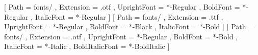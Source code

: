 [
  Path           = fonts/ ,
  Extension      = .otf ,
  UprightFont    = *-Regular ,
  BoldFont       = *-Regular ,
  ItalicFont     = *-Regular ]
\setsansfont{Montserrat}[
  Path           = fonts/ ,
  Extension      = .ttf ,
  UprightFont    = *-Regular ,
  BoldFont       = *-Black ,
  ItalicFont     = *-Bold ]
\setmonofont{FantasqueSansMono}[
  Path           = fonts/ ,
  Extension      = .otf ,
  UprightFont    = *-Regular ,
  BoldFont       = *-Bold ,
  ItalicFont     = *-Italic ,
  BoldItalicFont = *-BoldItalic ]
